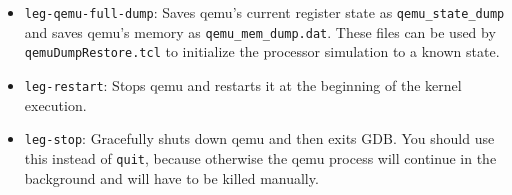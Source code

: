 \begin{itemize}
\item \texttt{leg-qemu-full-dump}: Saves qemu's current register state as \texttt{qemu\_state\_dump} and saves qemu's memory as \texttt{qemu\_mem\_dump.dat}. These files can be used by \texttt{qemuDumpRestore.tcl} to initialize the processor simulation to a known state.

\item \texttt{leg-restart}: Stops qemu and restarts it at the beginning of the kernel execution.

\item \texttt{leg-stop}: Gracefully shuts down qemu and then exits GDB. You should use this instead of \texttt{quit}, because otherwise the qemu process will continue in the background and will have to be killed manually.
\end{itemize}